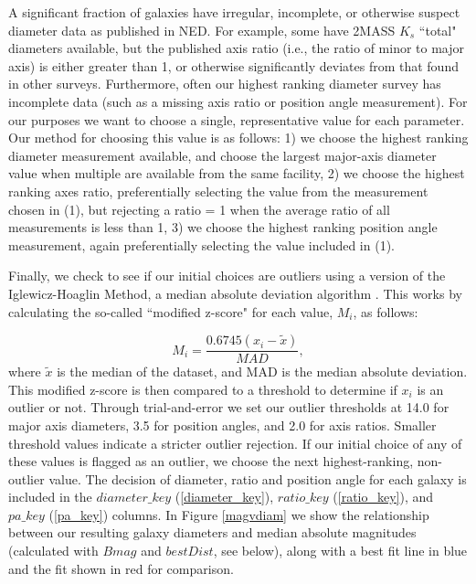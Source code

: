 A significant fraction of galaxies have irregular, incomplete, or otherwise suspect diameter data as published in NED. For example, some have 2MASS $K_s$ ``total" diameters available, but the published axis ratio (i.e., the ratio of minor to major axis) is either greater than 1, or otherwise significantly deviates from that found in other surveys. Furthermore, often our highest ranking diameter survey has incomplete data (such as a missing axis ratio or position angle measurement). For our purposes we want to choose a single, representative value for each parameter. Our method for choosing this value is as follows: 1) we choose the highest ranking diameter measurement available, and choose the largest major-axis diameter value when multiple are available from the same facility, 2) we choose the highest ranking axes ratio, preferentially selecting the value from the measurement chosen in (1), but rejecting a ratio = 1 when the average ratio of all measurements is less than 1, 3) we choose the highest ranking position angle measurement, again preferentially selecting the value included in (1).

Finally, we check to see if our initial choices are outliers using a version of the Iglewicz-Hoaglin Method, a median absolute deviation algorithm \citep{iglewicz1993}. This works by calculating the so-called ``modified z-score" for each value, $M_i$, as follows:

\begin{equation}
M_{i} = \frac{0.6745 (x_i - \tilde{x})}{MAD},
\end{equation}
\noindent where $\tilde{x}$ is the median of the dataset, and MAD is the median absolute deviation. This modified z-score is then compared to a threshold to determine if $x_i$ is an outlier or not. Through trial-and-error we set our outlier thresholds at 14.0 for major axis diameters, 3.5 for position angles, and 2.0 for axis ratios. Smaller threshold values indicate a stricter outlier rejection. If our initial choice of any of these values is flagged as an outlier, we choose the next highest-ranking, non-outlier value. The decision of diameter, ratio and position angle for each galaxy is included in the $diameter\_key$ (\ref{diameter_key}), $ratio\_key$ (\ref{ratio_key}), and $pa\_key$ (\ref{pa_key}) columns. In Figure \ref{magvdiam} we show the relationship between our resulting galaxy diameters and median absolute magnitudes (calculated with $Bmag$ and $bestDist$, see below), along with a best fit line in blue and the \cite{wakker2009} fit shown in red for comparison.


